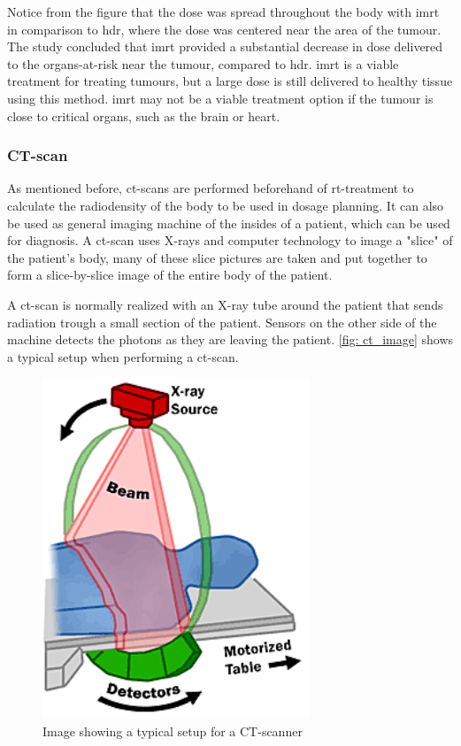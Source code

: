 \documentclass[main.tex]{subfiles}
\begin{document}
Notice from the figure that the dose was spread throughout the body with \gls{imrt} in comparison to \gls{hdr}, where the dose was centered near the area of the tumour. The study concluded that \gls{imrt} provided a substantial decrease in dose delivered to the organs-at-risk near the tumour, compared to \gls{hdr}\cite{imrtVShdr}. \gls{imrt} is a viable treatment for treating tumours, but a large dose is still delivered to healthy tissue using this method. \gls{imrt} may not be a viable treatment option if the tumour is close to critical organs, such as the brain or heart.

\subsubsection{CT-scan}
As mentioned before, \gls{ct}-scans are performed beforehand of \gls{rt}-treatment to calculate the radiodensity of the body to be used in dosage planning. It can also be used as general imaging machine of the insides of a patient, which can be used for diagnosis. A \gls{ct}-scan uses X-rays and computer technology to image a "slice" of the patient's body, many of these slice pictures are taken and put together to form a slice-by-slice image of the entire body of the patient.

A \gls{ct}-scan is normally realized with an X-ray tube around the patient that sends radiation trough a small section of the patient. Sensors on the other side of the machine detects the photons as they are leaving the patient. \autoref{fig: ct_image} shows a typical setup when performing a \gls{ct}-scan.

 \begin{figure}[!htpb]
    \centering
    \includegraphics[width=8cm ]{images/CTXRAYScan.png}
    \caption{Image showing a typical setup for a CT-scanner\cite{CTimage}}
    \label{fig: ct_image}
\end{figure}
\FloatBarrier 
\end{document}
